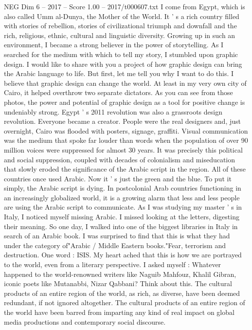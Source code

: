 \begin{textsample}{NEG Dim 6 – 2017 – Score 1.00 – 2017/t000607.txt}  \label{ex:f6_neg_019}
I come from Egypt, which is also called Umm al-Dunya, the Mother of the World.
It ' s a rich country filled with stories of rebellion, stories of civilizational triumph and downfall and the rich, religious, ethnic, cultural and linguistic diversity.
Growing up in such an environment, I became a strong believer in the power of storytelling.
As I searched for the medium with which to tell my story, I stumbled upon graphic design.
I would like to share with you a project of how graphic design can bring the Arabic language to life.
But first, let me tell you why I want to do this.
I believe that graphic design can change the world.
At least in my very own city of Cairo, it helped overthrow two separate dictators.
As you can see from those photos, the power and potential of graphic design as a tool for positive change is undeniably strong.
Egypt ' s 2011 revolution was also a grassroots design revolution.
Everyone became a creator.
People were the real designers and, just overnight, Cairo was flooded with posters, signage, graffiti.
Visual communication was the medium that spoke far louder than words when the population of over 90 million voices were suppressed for almost 30 years.
It was precisely this political and social suppression, coupled with decades of colonialism and miseducation that slowly eroded the significance of the Arabic script in the region.
All of these countries once used Arabic.
Now it ' s just the green and the blue.
To put it simply, the Arabic script is dying.
In postcolonial Arab countries functioning in an increasingly globalized world, it is a growing alarm that less and less people are using the Arabic script to communicate.
As I was studying my master ' s in Italy, I noticed myself missing Arabic.
I missed looking at the letters, digesting their meaning.
So one day, I walked into one of the biggest libraries in Italy in search of an Arabic book.
I was surprised to find that this is what they had under the category of"Arabic / Middle Eastern books."Fear, terrorism and destruction.
One word : ISIS.
My heart ached that this is how we are portrayed to the world, even from a literary perspective.
I asked myself : Whatever happened to the world-renowned writers like Naguib Mahfouz, Khalil Gibran, iconic poets like Mutanabbi, Nizar Qabbani?
Think about this.
The cultural products of an entire region of the world, as rich, as diverse, have been deemed redundant, if not ignored altogether.
The cultural products of an entire region of the world have been barred from imparting any kind of real impact on global media productions and contemporary social discourse.

\end{textsample}
